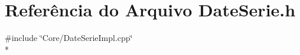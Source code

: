 \section{Referência do Arquivo Date\+Serie.\+h}
\label{_date_serie_8h}
{\ttfamily \#include \char`\"{}Core/\+Date\+Serie\+Impl.\+cpp\char`\"{}}\\*
